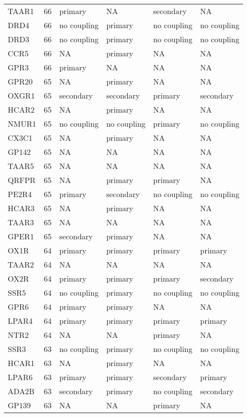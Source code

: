 \begin{longtable}{lrllll}
TAAR1 & 66 & primary & NA & secondary & NA\\
\addlinespace
DRD4 & 66 & no coupling & primary & no coupling & no coupling\\
DRD3 & 66 & no coupling & primary & no coupling & no coupling\\
CCR5 & 66 & NA & primary & NA & NA\\
GPR3 & 66 & primary & NA & NA & NA\\
GPR20 & 65 & NA & primary & NA & NA\\
\addlinespace
OXGR1 & 65 & secondary & secondary & primary & secondary\\
HCAR2 & 65 & NA & primary & NA & NA\\
NMUR1 & 65 & no coupling & no coupling & primary & no coupling\\
CX3C1 & 65 & NA & primary & NA & NA\\
GP142 & 65 & NA & NA & NA & NA\\
\addlinespace
TAAR5 & 65 & NA & NA & NA & NA\\
QRFPR & 65 & NA & primary & primary & NA\\
PE2R4 & 65 & primary & secondary & no coupling & no coupling\\
HCAR3 & 65 & NA & primary & NA & NA\\
TAAR3 & 65 & NA & NA & NA & NA\\
\addlinespace
GPER1 & 65 & secondary & primary & NA & NA\\
OX1R & 64 & primary & primary & primary & primary\\
TAAR2 & 64 & NA & NA & NA & NA\\
OX2R & 64 & primary & primary & primary & secondary\\
SSR5 & 64 & no coupling & primary & no coupling & no coupling\\
\addlinespace
GPR6 & 64 & primary & primary & NA & NA\\
LPAR4 & 64 & primary & primary & primary & primary\\
NTR2 & 64 & NA & NA & primary & NA\\
SSR3 & 63 & no coupling & primary & no coupling & no coupling\\
HCAR1 & 63 & NA & primary & NA & NA\\
\addlinespace
LPAR6 & 63 & primary & primary & secondary & primary\\
ADA2B & 63 & secondary & primary & no coupling & secondary\\
GP139 & 63 & NA & NA & primary & NA\\

\end{longtable}
